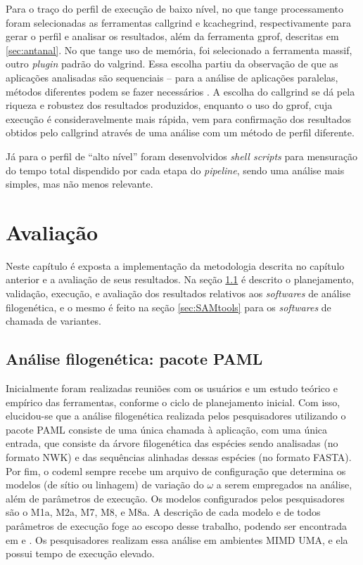 \documentclass[cic,tc]{iiufrgs}
\begin{document}
Para o traço do perfil de execução de baixo nível, no que tange processamento
foram selecionadas as ferramentas callgrind e kcachegrind, respectivamente para
gerar o perfil e analisar os resultados, além da ferramenta gprof, descritas em
\ref{sec:antanal}. No que tange uso de memória, foi selecionado a ferramenta
massif, outro \textit{plugin} padrão do valgrind. Essa escolha partiu da
observação de que as aplicações analisadas são sequenciais -- para a análise de
aplicações paralelas, métodos diferentes podem se fazer necessários
\cite{weidendorfer2008sequential}. A escolha do callgrind se dá pela riqueza e
robustez dos resultados produzidos, enquanto o uso do gprof, cuja execução é
consideravelmente mais rápida, vem para confirmação dos resultados obtidos pelo
callgrind através de uma análise com um método de perfil diferente.

Já para o perfil de ``alto nível'' foram desenvolvidos \textit{shell scripts}
para mensuração do tempo total dispendido por cada etapa do \textit{pipeline}, sendo uma
análise mais simples, mas não menos relevante.

%
%
%
%
\chapter{Avaliação}
\label{chap:imp}

Neste capítulo é exposta a implementação da metodologia descrita no capítulo
anterior e a avaliação de seus resultados. Na seção \ref{sec:filomp} é descrito
o planejamento, validação, execução, e avaliação dos resultados relativos aos
\textit{softwares} de análise filogenética, e o mesmo é feito na seção
\ref{sec:SAMtools} para os \textit{softwares} de chamada de variantes.

\section{Análise filogenética: pacote PAML}
\label{sec:filomp}

Inicialmente foram realizadas reuniões com os usuários e um estudo teórico e
empírico das ferramentas, conforme o ciclo de planejamento inicial. Com isso,
elucidou-se que a análise filogenética realizada pelos pesquisadores utilizando
o pacote PAML consiste de uma única chamada à aplicação, com uma única entrada,
que consiste da árvore filogenética das espécies sendo analisadas (no formato
NWK) e das sequências alinhadas dessas espécies (no formato FASTA). Por fim, o
codeml sempre recebe um arquivo de configuração que determina os modelos (de
sítio ou linhagem) de variação do $\omega$ a serem empregados na análise, além
de parâmetros de execução. Os modelos configurados pelos pesquisadores são o
M1a, M2a, M7, M8, e M8a. A descrição de cada modelo e de todos parâmetros de
execução foge ao escopo desse trabalho, podendo ser encontrada em
\cite{yang2000codon} e \cite{zhang2005evaluation}. Os pesquisadores realizam
essa análise em ambientes MIMD UMA, e ela possui tempo de execução elevado. 
\end{document}
